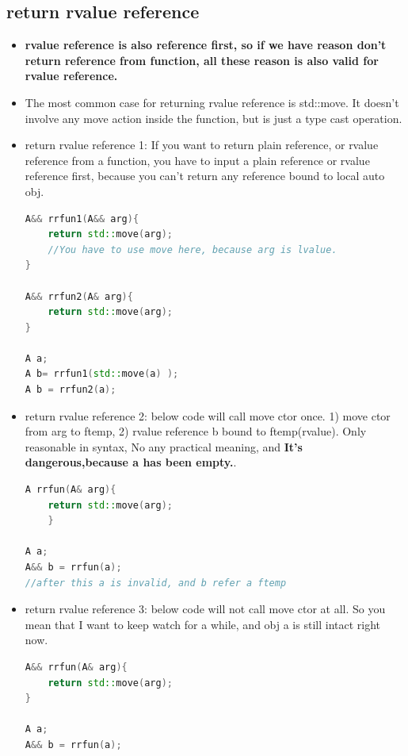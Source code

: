 \documentclass[a4paper,11pt,twoside]{book}
\begin{document}
\subsection{return rvalue reference}
\begin{itemize}
	\item \textbf{rvalue reference is also reference first, so if we have reason don't return reference from function, all these reason is also valid for rvalue reference.}
	
	\item The most common case for returning rvalue reference is std::move. It doesn't involve any move action inside the function, but is just a type cast operation.
	
	\item return rvalue reference 1:   If you want to return plain reference, or rvalue reference from a function, you have to input a plain reference or rvalue reference first, because you can't return any reference bound to local auto obj.
	
\begin{lstlisting}[frame=single, language=c++]
A&& rrfun1(A&& arg){
	return std::move(arg);
	//You have to use move here, because arg is lvalue.
}
	
A&& rrfun2(A& arg){
	return std::move(arg);
}
	
A a;
A b= rrfun1(std::move(a) );
A b = rrfun2(a);
\end{lstlisting}
	
	
	\item return rvalue reference 2:   below code will call move ctor once.  1) move ctor from arg to ftemp, 2) rvalue reference b bound to ftemp(rvalue). Only reasonable in syntax, No any practical meaning, and \textbf{It's dangerous,because a has been empty.}.
\begin{lstlisting}[frame=single, language=c++]
A rrfun(A& arg){
	return std::move(arg);
	}
	
A a;
A&& b = rrfun(a);
//after this a is invalid, and b refer a ftemp
\end{lstlisting}
	

	\item return rvalue reference 3:   below code will not call move ctor at all. So you mean that I want to keep watch for a while, and obj a is still intact right now.
\begin{lstlisting}[frame=single, language=c++]
A&& rrfun(A& arg){
	return std::move(arg);
}
	
A a;
A&& b = rrfun(a);
\end{lstlisting}
	

\end{itemize}
\end{document}
